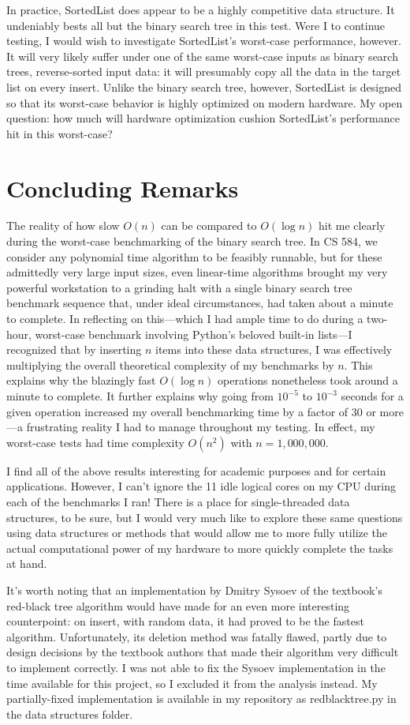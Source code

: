 \documentclass{article}
\begin{document}
In practice, SortedList does appear to be a highly competitive data structure. It undeniably bests all but the binary search tree in this test. Were I to continue testing, I would wish to investigate SortedList's worst-case performance, however. It will very likely suffer under one of the same worst-case inputs as binary search trees, reverse-sorted input data: it will presumably copy all the data in the target list on every insert. Unlike the binary search tree, however, SortedList is designed so that its worst-case behavior is highly optimized on modern hardware. My open question: how much will hardware optimization cushion SortedList's performance hit in this worst-case?

\section{Concluding Remarks}
The reality of how slow $O(n)$ can be compared to $O(\log n)$ hit me clearly during the worst-case benchmarking of the binary search tree. In CS 584, we consider any polynomial time algorithm to be feasibly runnable, but for these admittedly very large input sizes, even linear-time algorithms brought my very powerful workstation to a grinding halt with a single binary search tree benchmark sequence that, under ideal circumstances, had taken about a minute to complete. In reflecting on this---which I had ample time to do during a two-hour, worst-case benchmark involving Python's beloved built-in lists---I recognized that by inserting $n$ items into these data structures, I was effectively multiplying the overall theoretical complexity of my benchmarks by $n$. This explains why the blazingly fast $O(\log n)$ operations nonetheless took around a minute to complete. It further explains why going from $10^{-5}$ to $10^{-3}$ seconds for a given operation increased my overall benchmarking time by a factor of 30 or more---a frustrating reality I had to manage throughout my testing. In effect, my worst-case tests had time complexity $O(n^2)$ with $n = 1,000,000$.

I find all of the above results interesting for academic purposes and for certain applications. However, I can't ignore the 11 idle logical cores on my CPU during each of the benchmarks I ran! There is a place for single-threaded data structures, to be sure, but I would very much like to explore these same questions using data structures or methods that would allow me to more fully utilize the actual computational power of my hardware to more quickly complete the tasks at hand.

It's worth noting that an implementation by Dmitry Sysoev of the textbook's red-black tree algorithm would have made for an even more interesting counterpoint: on insert, with random data, it had proved to be the fastest algorithm. Unfortunately, its deletion method was fatally flawed, partly due to design decisions by the textbook authors that made their algorithm very difficult to implement correctly. I was not able to fix the Sysoev implementation in the time available for this project, so I excluded it from the analysis instead. My partially-fixed implementation is available in my repository as redblacktree.py in the data structures folder.
\end{document}
